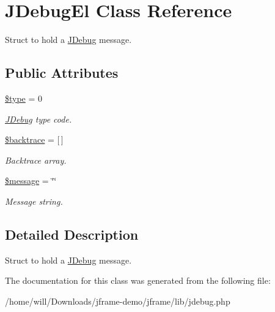 \hypertarget{classJDebugEl}{\section{J\-Debug\-El Class Reference}
\label{classJDebugEl}
}


Struct to hold a \hyperlink{classJDebug}{J\-Debug} message.  


\subsection*{Public Attributes}
\begin{DoxyCompactItemize}
\item 
\hypertarget{classJDebugEl_ade6f0773c23fe144e79a0088dddb89de}{\hyperlink{classJDebugEl_ade6f0773c23fe144e79a0088dddb89de}{\$type} = 0}\label{classJDebugEl_ade6f0773c23fe144e79a0088dddb89de}

\begin{DoxyCompactList}\small\item\em \hyperlink{classJDebug}{J\-Debug} type code. \end{DoxyCompactList}\item 
\hypertarget{classJDebugEl_a61de3f00da8b54df90c17f97b32d5697}{\hyperlink{classJDebugEl_a61de3f00da8b54df90c17f97b32d5697}{\$backtrace} = \mbox{[}$\,$\mbox{]}}\label{classJDebugEl_a61de3f00da8b54df90c17f97b32d5697}

\begin{DoxyCompactList}\small\item\em Backtrace array. \end{DoxyCompactList}\item 
\hypertarget{classJDebugEl_a63c86da9429dc28078f3b3df3d983d2f}{\hyperlink{classJDebugEl_a63c86da9429dc28078f3b3df3d983d2f}{\$message} = \char`\"{}\char`\"{}}\label{classJDebugEl_a63c86da9429dc28078f3b3df3d983d2f}

\begin{DoxyCompactList}\small\item\em Message string. \end{DoxyCompactList}\end{DoxyCompactItemize}


\subsection{Detailed Description}
Struct to hold a \hyperlink{classJDebug}{J\-Debug} message. 

The documentation for this class was generated from the following file\-:\begin{DoxyCompactItemize}
\item 
/home/will/\-Downloads/jframe-\/demo/jframe/lib/jdebug.\-php\end{DoxyCompactItemize}
